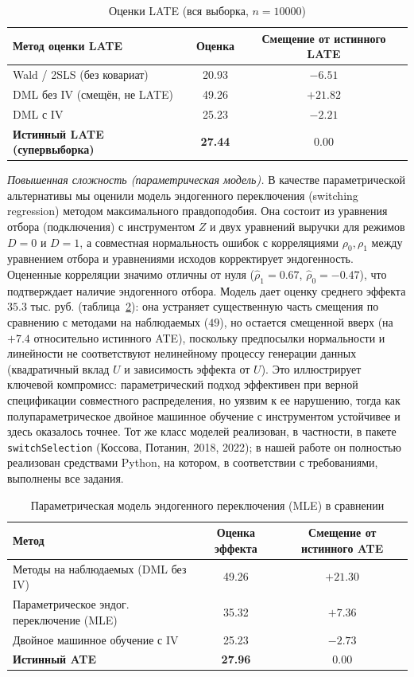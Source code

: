\documentclass[12pt,a4paper]{article}
\begin{document}
\begin{table}[H]\centering\small
\caption{Оценки LATE (вся выборка, $n=10000$)}\label{tab:late}
\begin{tabular}{lcc}\toprule
Метод оценки LATE & Оценка & Смещение от истинного LATE\\\midrule
Wald / 2SLS (без ковариат) & 20.93 & $-6.51$\\
DML без IV (смещён, не LATE) & 49.26 & $+21.82$\\
DML с IV & 25.23 & $-2.21$\\
\textbf{Истинный LATE (супервыборка)} & \textbf{27.44} & $0.00$\\\bottomrule
\end{tabular}
\end{table}

\textit{Повышенная сложность (параметрическая модель).} В качестве параметрической альтернативы мы оценили модель эндогенного переключения (switching regression) методом максимального правдоподобия. Она состоит из уравнения отбора (подключения) с инструментом $Z$ и двух уравнений выручки для режимов $D=0$ и $D=1$, а совместная нормальность ошибок с корреляциями $\rho_0,\rho_1$ между уравнением отбора и уравнениями исходов корректирует эндогенность. Оцененные корреляции значимо отличны от нуля ($\hat\rho_1=0.67$, $\hat\rho_0=-0.47$), что подтверждает наличие эндогенного отбора. Модель дает оценку среднего эффекта $35.3$ тыс. руб. (таблица~\ref{tab:switch}): она устраняет существенную часть смещения по сравнению с методами на наблюдаемых ($49$), но остается смещенной вверх (на $+7.4$ относительно истинного ATE), поскольку предпосылки нормальности и линейности не соответствуют нелинейному процессу генерации данных (квадратичный вклад $U$ и зависимость эффекта от $U$). Это иллюстрирует ключевой компромисс: параметрический подход эффективен при верной спецификации совместного распределения, но уязвим к ее нарушению, тогда как полупараметрическое двойное машинное обучение с инструментом устойчивее и здесь оказалось точнее. Тот же класс моделей реализован, в частности, в пакете \texttt{switchSelection} (Коссова, Потанин, 2018, 2022); в нашей работе он полностью реализован средствами Python, на котором, в соответствии с требованиями, выполнены все задания.

\begin{table}[H]\centering\small
\caption{Параметрическая модель эндогенного переключения (MLE) в сравнении}\label{tab:switch}
\begin{tabular}{lcc}\toprule
Метод & Оценка эффекта & Смещение от истинного ATE\\\midrule
Методы на наблюдаемых (DML без IV) & 49.26 & $+21.30$\\
Параметрическое эндог. переключение (MLE) & 35.32 & $+7.36$\\
Двойное машинное обучение с IV & 25.23 & $-2.73$\\
\textbf{Истинный ATE} & \textbf{27.96} & $0.00$\\\bottomrule
\end{tabular}
\end{table}
\end{document}
